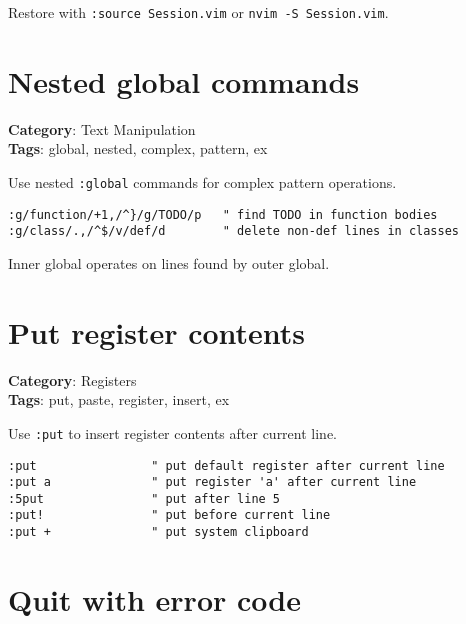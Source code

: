 {{{{Restore with {\footnotesize \Verb§:source Session.vim§} or {\footnotesize \Verb§nvim -S Session.vim§}.

\section{Nested global commands}

\textbf{Category}: Text Manipulation\\ \textbf{Tags}: global, nested, complex, pattern, ex
\vspace{0.5cm}

Use nested {\footnotesize \Verb§:global§} commands for complex pattern operations.

\begin{Exa*}{}
\begin{Verbatim}[fontsize=\footnotesize, breaklines, breakanywhere]
:g/function/+1,/^}/g/TODO/p   " find TODO in function bodies
:g/class/.,/^$/v/def/d        " delete non-def lines in classes
\end{Verbatim}
\end{Exa*}

Inner global operates on lines found by outer global.

\section{Put register contents}

\textbf{Category}: Registers\\ \textbf{Tags}: put, paste, register, insert, ex
\vspace{0.5cm}

Use {\footnotesize \Verb§:put§} to insert register contents after current line.

\begin{Exa*}{}
\begin{Verbatim}[fontsize=\footnotesize, breaklines, breakanywhere]
:put                " put default register after current line
:put a              " put register 'a' after current line
:5put               " put after line 5
:put!               " put before current line
:put +              " put system clipboard
\end{Verbatim}
\end{Exa*}

\section{Quit with error code}

}}}}
